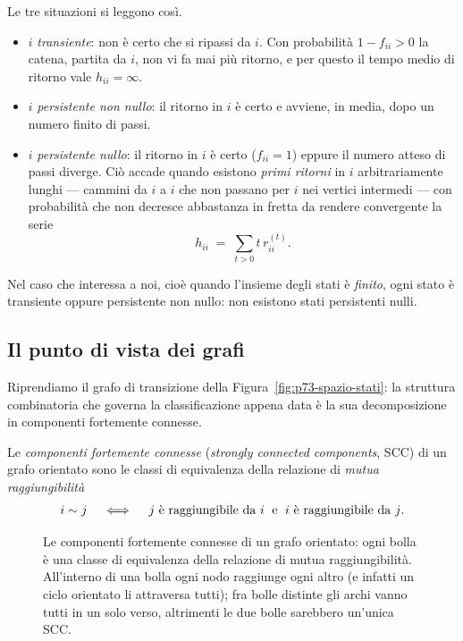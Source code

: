 \begin{osservazione}
Le tre situazioni si leggono così.
\begin{itemize}
  \item $i$ \emph{transiente}: non è certo che si ripassi da $i$. Con probabilità
    $1-f_{ii} > 0$ la catena, partita da $i$, non vi fa mai più ritorno, e per questo
    il tempo medio di ritorno vale $h_{ii} = \infty$.
  \item $i$ \emph{persistente non nullo}: il ritorno in $i$ è certo e avviene, in media,
    dopo un numero finito di passi.
  \item $i$ \emph{persistente nullo}: il ritorno in $i$ è certo ($f_{ii}=1$) eppure il
    numero atteso di passi diverge. Ciò accade quando esistono \emph{primi ritorni} in $i$
    arbitrariamente lunghi --- cammini da $i$ a $i$ che non passano per $i$ nei vertici
    intermedi --- con probabilità che non decresce abbastanza in fretta da rendere
    convergente la serie
    \[
      h_{ii} \;=\; \sum_{t>0} t\, r_{ii}^{(t)} .
    \]
\end{itemize}
\end{osservazione}

\begin{proposizione}\label{prop:mc-finita-no-nulli}
Nel caso che interessa a noi, cioè quando l'insieme degli stati è \emph{finito}, ogni stato è
transiente oppure persistente non nullo: non esistono stati persistenti nulli.
\end{proposizione}

\subsection{Il punto di vista dei grafi}

Riprendiamo il grafo di transizione della Figura~\ref{fig:p73-spazio-stati}: la struttura
combinatoria che governa la classificazione appena data è la sua decomposizione in
componenti fortemente connesse.

\begin{definizione}\label{def:scc}
Le \emph{componenti fortemente connesse} (\emph{strongly connected components}, SCC) di un
grafo orientato sono le classi di equivalenza della relazione di \emph{mutua raggiungibilità}
\[
  i \sim j
  \quad\iff\quad
  \text{$j$ è raggiungibile da $i$\; e\; $i$ è raggiungibile da $j$.}
\]
\end{definizione}

\begin{figure}[H]
\centering

\caption{Le componenti fortemente connesse di un grafo orientato: ogni bolla è una classe di
equivalenza della relazione di mutua raggiungibilità. All'interno di una bolla ogni nodo
raggiunge ogni altro (e infatti un ciclo orientato li attraversa tutti); fra bolle distinte
gli archi vanno tutti in un solo verso, altrimenti le due bolle sarebbero un'unica SCC.}
\label{fig:p76-scc}
\end{figure}

